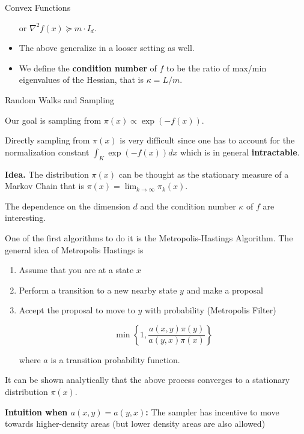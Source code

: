 \documentclass[10pt]{beamer}
\begin{document}
\begin{frame}[allowframebreaks]{Convex Functions}
\begin{itemize}
    or $\nabla^2 f(x) \succeq m \cdot I_d$.
    
    \item The above generalize in a looser setting as well.     
    
    \item We define the \textbf{condition number} of $f$ to be the ratio of max/min eigenvalues of the Hessian, that is $\kappa = L / m$.
    
\end{itemize}
\end{frame}

\begin{frame}[allowframebreaks]{Random Walks and Sampling}

    Our goal is sampling from $\pi(x) \propto \exp(-f(x))$. 
    
    \medskip
    
    Directly sampling from $\pi(x)$ is very difficult since one has to account for the normalization constant $\int_K \exp(-f(x)) d x$ which is in general \textbf{intractable}. 
    
    \medskip
    
    \textbf{Idea.} The distribution $\pi(x)$ can be thought as the stationary measure of a Markov Chain that is $\pi(x) = \lim_{k \to \infty} \pi_k(x)$. 

    \medskip

    The dependence on the dimension $d$ and the condition number $\kappa$ of $f$ are interesting.
    
    \framebreak
    
    One of the first algorithms to do it is the Metropolis-Hastings Algorithm. The general idea of Metropolis Hastings is 
    
    \begin{enumerate}
        \item Assume that you are at a state $x$ 
        \item Perform a transition to a new nearby state $y$ and make a proposal
        \item Accept the proposal to move to $y$ with probability (Metropolis Filter)
        
        $$\min \left  \{ 1, \frac { a (x, y) \pi(y) } {a (y, x) \pi (x)} \right \}$$
        
        where $a$ is a transition probability function. 
        
    \end{enumerate}
    
    It can be shown analytically that the above process converges to a stationary distribution $\pi(x)$.
    
    \textbf{Intuition when $a(x,y) = a(y,x)$:} The sampler has incentive to move towards higher-density areas (but lower density areas are also allowed)
    
\end{frame}
\end{document}

